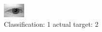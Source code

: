 \begin{figure}[h!]
\begin{center}
\includegraphics[width=0.60\columnwidth]{figures/ID379_class_1_target_2.png}
\end{center}
\caption{ Classification: 1 actual target: 2}
\label{fig:ID379_class_1_target_2}
\end{figure}
